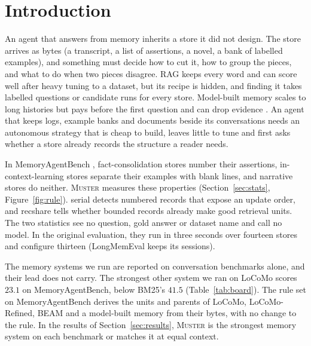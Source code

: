 \documentclass{article}
\newcommand{\sys}{\textsc{Muster}}
\newcommand{\serial}{\textsf{serial}}
\newcommand{\cov}{\textsf{recshare}}
\begin{document}
\section{Introduction}

An agent that answers from memory inherits a store it did not design. The store arrives as bytes (a
transcript, a list of assertions, a novel, a bank of labelled examples), and something must decide how to cut
it, how to group the pieces, and what to do when two pieces disagree. RAG keeps every word and can score well after heavy tuning to a dataset, but its recipe is hidden, and finding it takes labelled questions or candidate runs for every store. Model-built memory scales to long histories but pays before the first question and can drop evidence \cite{fidelity}. An agent that keeps logs, example banks and documents beside its conversations needs an autonomous strategy that is cheap to build, leaves little to tune and first asks whether a store already records the structure a reader needs.

In MemoryAgentBench \cite{mab}, fact-consolidation stores number their assertions,
in-context-learning stores separate their examples with blank lines, and narrative stores do neither. \sys{}
measures these properties (Section~\ref{sec:stats}, Figure~\ref{fig:rule}). \serial{} detects numbered records that
expose an update order, and \cov{} tells whether bounded records already make good retrieval units. The
two statistics see no question, gold answer or dataset name and call no model. In the original evaluation, they run
in three seconds over fourteen stores and configure thirteen (LongMemEval keeps its sessions).

The memory systems we run are reported on conversation benchmarks alone, and their lead does not carry. The strongest other system we ran on LoCoMo scores $23.1$ on MemoryAgentBench, below BM25's $41.5$ (Table~\ref{tab:board}). The rule set on MemoryAgentBench derives the units and parents of LoCoMo, LoCoMo-Refined, BEAM and a model-built memory from their bytes, with no change to the rule. In the results of Section~\ref{sec:results}, \sys{} is the strongest memory system on each benchmark or matches it at equal context.
\end{document}
